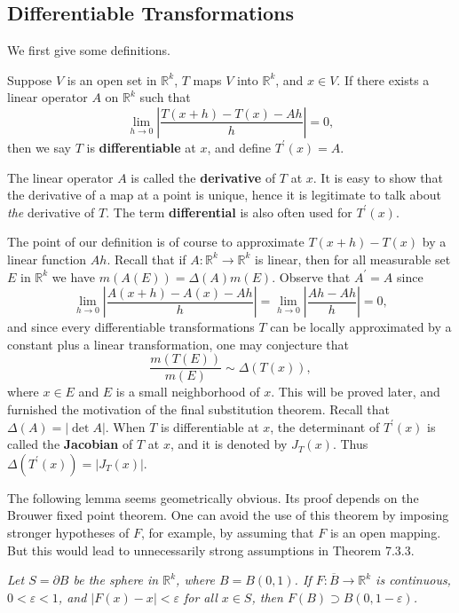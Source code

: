 \subsection{Differentiable Transformations}
We first give some definitions.
\begin{definition}
Suppose $V$ is an open set in $\mathbb{R}^k$, $T$ maps $V$ into $\mathbb{R}^k$, and $x\in V$. If there exists a linear operator $A$ on $\mathbb{R}^k$ such that 
$$
\lim_{h\rightarrow 0} \left| \frac{T\left( x+h \right) -T\left( x \right) -Ah}{h} \right|=0,
$$
then we say $T$ is \textbf{differentiable} at $x$, and define $T^\prime(x)=A$.
\end{definition}
The linear operator $A$ is called the \textbf{derivative} of $T$ at $x$. It is easy to show that the derivative of a map at a point is unique, hence it is legitimate to talk about \textit{the} derivative of $T$. The term \textbf{differential} is also often used for $T^\prime(x)$.\par
The point of our definition is of course to approximate $T(x+h)-T(x)$ by a linear function $Ah$. Recall that if $A:\mathbb{R}^k\to\mathbb{R}^k$ is linear, then for all measurable set $E$ in $\mathbb{R}^k$ we have $m(A(E))=\Delta(A)m(E)$. Observe that $A^\prime=A$ since 
$$
\lim_{h\rightarrow 0} \left| \frac{A\left( x+h \right) -A\left( x \right) -Ah}{h} \right|=\lim_{h\rightarrow 0} \left| \frac{Ah-Ah}{h} \right|=0,
$$
and since every differentiable transformations $T$ can be locally approximated by a constant plus a linear transformation, one may conjecture that 
$$
\frac{m\left( T\left( E \right) \right)}{m\left( E \right)}\sim \Delta \left( T\left( x \right) \right) ,
$$
where $x\in E$ and $E$ is a small neighborhood of $x$. This will be proved later, and furnished the motivation of the final substitution theorem.
Recall that $\Delta(A)=|\det A|$. When $T$ is differentiable at $x$, the determinant of $T^\prime(x)$ is called the \textbf{Jacobian} of $T$ at $x$, and it is denoted by $J_T(x)$. Thus $\Delta(T^\prime(x))=|J_T(x)|$.\par
The following lemma seems geometrically obvious. Its proof depends on the Brouwer fixed point theorem. One can avoid the use of this theorem by imposing stronger hypotheses of $F$, for example, by assuming that $F$ is an open mapping. But this would lead to unnecessarily strong assumptions in Theorem 7.3.3.
\begin{lemma}\em
Let $S=\partial B$ be the sphere in $\mathbb{R}^k$, where $B=B(0,1)$. If $F:\overline{B}\to\mathbb{R}^k$ is continuous, $0<\varepsilon<1$, and $|F(x)-x|<\varepsilon$ for all $x\in S$, then $F(B)\supset B(0,1-\varepsilon)$.
\end{lemma}
